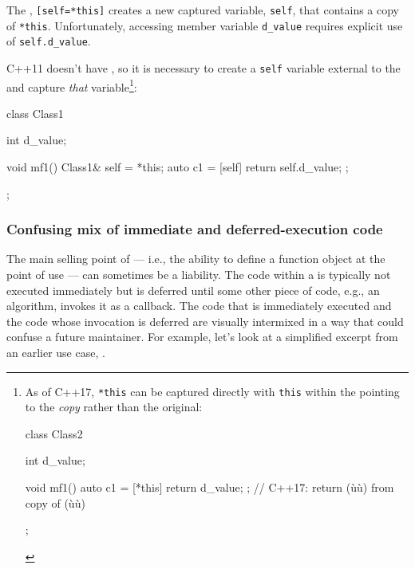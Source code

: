 The , \lstinline![self=*this]! creates a new
captured variable, \lstinline!self!, that contains a copy of
\lstinline!*this!. Unfortunately, accessing member variable
\lstinline!d_value! requires explicit use of \lstinline!self.d_value!.

C++11 doesn't have , so it is necessary to create a
\lstinline!self! variable external to the  and
capture \emph{that} variable{\cprotect\footnote{As of C++17,
\lstinline!*this! can be captured directly with \lstinline!this! within the
 pointing to the \emph{copy} rather than the
original:

\begin{emcppslisting}[style=footcode]
class Class2
{
    int d_value;

    void mf1()
    {
        auto c1 = [*this]{ return d_value; };
            // C++17: return (ù{}ù) from copy of (ù{}ù)
    }
};
\end{emcppslisting}
      }}:

\begin{emcppslisting}
class Class1
{
    int d_value;

    void mf1()
    {
        Class1& self = *this;
        auto c1 = [self]{ return self.d_value; };
    }
};
\end{emcppslisting}
    

\subsubsection[Confusing mix of immediate and deferred-execution code]{Confusing mix of immediate and deferred-execution code}\label{confusing-mix-of-immediate-and-deferred-execution-code}

The main selling point of  --- i.e., the
ability to define a function object at the point of use --- can
sometimes be a liability. The code within a  is
typically not executed immediately but is deferred until some other
piece of code, e.g., an algorithm, invokes it as a callback. The code
that is immediately executed and the code whose invocation is deferred
are visually intermixed in a way that could confuse a future maintainer.
For example, let's look at a simplified excerpt from an earlier use
case, .

